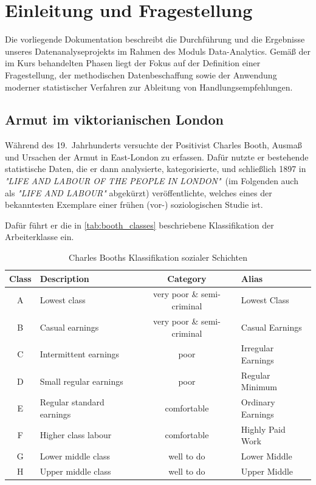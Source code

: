 \chapter{Einleitung und Fragestellung}
\label{chap:einleitung}

Die vorliegende Dokumentation beschreibt die Durchführung und die Ergebnisse unseres Datenanalyseprojekts im Rahmen des Moduls Data-Analytics.
Gemäß der im Kurs behandelten Phasen liegt der Fokus auf der Definition einer Fragestellung,
der methodischen Datenbeschaffung sowie der Anwendung moderner statistischer Verfahren zur Ableitung von Handlungsempfehlungen.

\section*{Armut im viktorianischen London}
\label{sec:kontext}
Während des 19.\ Jahrhunderts versuchte der Positivist Charles Booth, Ausmaß und Ursachen der Armut in East-London zu erfassen.
Dafür nutzte er bestehende statistische Daten,
die er dann analysierte, kategorisierte, und schließlich 1897 in \textit{"LIFE AND LABOUR OF THE PEOPLE IN LONDON"}\ (im Folgenden auch als \textit{"LIFE AND LABOUR"} abgekürzt)
\cite{life_and_labour} veröffentlichte,
welches eines der bekanntesten Exemplare einer frühen (vor-) soziologischen Studie ist.

Dafür führt er die in \autoref{tab:booth_classes} beschriebene Klassifikation der Arbeiterklasse ein.

\begin{table}[htbp]
\centering
\caption{Charles Booths Klassifikation sozialer Schichten}
\label{tab:booth_classes}

\begin{tabular}{|c|p{4.8cm}|c|p{3.8cm}|}
\hline
\textbf{Class} & \textbf{Description} & \textbf{Category} & \textbf{Alias} \\
\hline

A & Lowest class &
very poor \& semi-criminal &
Lowest Class \\
\hline

B & Casual earnings &
very poor \& semi-criminal &
Casual Earnings \\
\hline

C & Intermittent earnings &
poor &
Irregular Earnings \\
\hline

D & Small regular earnings &
poor &
Regular Minimum \\
\hline

E & Regular standard earnings &
comfortable &
Ordinary Earnings \\
\hline

F & Higher class labour &
comfortable &
Highly Paid Work \\
\hline

G & Lower middle class &
well to do &
Lower Middle \\
\hline

H & Upper middle class &
well to do &
Upper Middle \\
\hline

\end{tabular}
\end{table}

